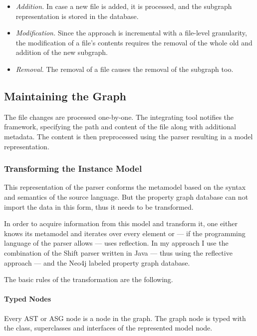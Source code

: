 \begin{itemize}[topsep=0pt]

  \item \emph{Addition.} In case a new file is added, it is processed, and the subgraph representation is stored in the database.

  \item \emph{Modification.} Since the approach is incremental with a file-level granularity, the modification of a file's contents requires the removal of the whole old and addition of the new subgraph.

  \item \emph{Removal.} The removal of a file causes the removal of the subgraph too.
\end{itemize}

\subsection{Maintaining the Graph}
\label{sect:maintaining-the-graph}

The file changes are processed one-by-one. The integrating tool notifies the framework, specifying the path and content of the file along with additional metadata. The content is then preprocessed using the parser resulting in a model representation.

\subsubsection{Transforming the Instance Model}
This representation of the parser conforms the metamodel based on the syntax and semantics of the source language. But the property graph database can not import the data in this form, thus it needs to be transformed.

In order to acquire information from this model and transform it, one either knows its metamodel and iterates over every element or --- if the programming language of the parser allows --- uses reflection. In my approach I use the combination of the Shift parser written in Java --- thus using the reflective approach --- and the Neo4j labeled property graph database.

The basic rules of the transformation are the following.

\paragraph{Typed Nodes}
Every AST or ASG node is a node in the graph. The graph node is typed with the class, superclasses and interfaces of the represented model node.

